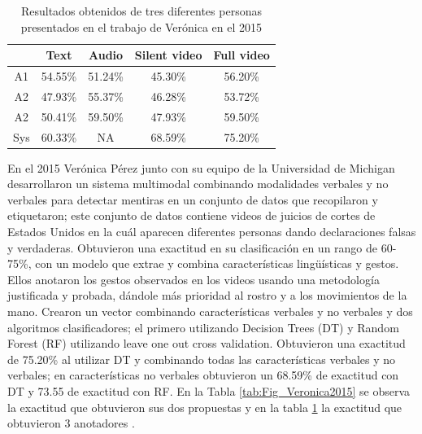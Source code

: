 \begin{onehalfspacing}
\begin{table}[h!]
\centering
    \begin{tabular}{|c|c|c|c|c|}
        \cline{2-5} \cline{3-5} \cline{4-5} \cline{5-5} 
        \multicolumn{1}{c|}{} & Text & Audio & Silent video & Full video\tabularnewline
        \hline 
        A1 & 54.55\% & 51.24\% & 45.30\% & 56.20\%\tabularnewline
        \hline 
        A2 & 47.93\% & 55.37\% & 46.28\% & 53.72\%\tabularnewline
        \hline 
        A2 & 50.41\% & 59.50\% & 47.93\% & 59.50\%\tabularnewline
        \hline 
        Sys & 60.33\% & NA & 68.59\% & 75.20\%\tabularnewline
        \hline 
    \end{tabular}%
	\caption{Resultados obtenidos de tres diferentes personas presentados en el trabajo de Verónica en el 2015}
	\label{tab:Fig_Veronica2015anotadores}
\end{table}

En el 2015 Verónica Pérez junto con su equipo de la Universidad de Michigan desarrollaron un sistema multimodal combinando modalidades verbales y no verbales para detectar mentiras en un conjunto de datos que recopilaron y etiquetaron; este conjunto de datos contiene videos de juicios de cortes de Estados Unidos en la cuál aparecen diferentes personas dando declaraciones falsas y verdaderas. Obtuvieron una exactitud en su clasificación en un rango de 60-75\%, con un modelo que extrae y combina características lingüísticas y gestos.  Ellos anotaron los gestos observados en los videos usando una metodología justificada y probada, dándole más prioridad al rostro y a los movimientos de la mano. Crearon un vector combinando características verbales y no verbales y dos algoritmos clasificadores; el primero utilizando Decision Trees (DT) y Random Forest (RF) utilizando leave one out cross validation. Obtuvieron una exactitud de 75.20\% al utilizar DT  y combinando todas las características verbales y no verbales; en características no verbales obtuvieron un 68.59\% de exactitud con DT y 73.55 de exactitud con RF.  En la Tabla \ref{tab:Fig_Veronica2015} se observa la exactitud que obtuvieron sus dos propuestas y en la tabla \ref{tab:Fig_Veronica2015anotadores} la exactitud que obtuvieron 3 anotadores \cite{Perez-Rosas2015VerbalDetection}.\\


\end{onehalfspacing}
